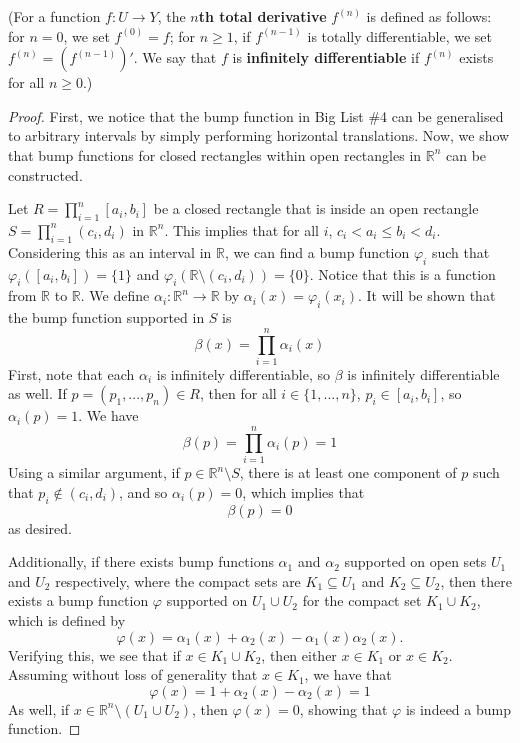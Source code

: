 \documentclass{article}
\theoremstyle{plain} %
\numberwithin{thm}{section} %
\theoremstyle{definition}
\begin{document}
        (For a function $f:U\rightarrow Y$, the \textbf{$n$th total derivative} $f^{(n)}$ is defined as follows: for $n=0$, we set $f^{(0)}=f$; for $n\geq 1$, if $f^{(n-1)}$ is totally differentiable, we set $f^{(n)} = (f^{(n-1)})'$. We say that $f$ is \textbf{infinitely differentiable} if $f^{(n)}$ exists for all $n\geq 0$.)

        \begin{proof}
            First, we notice that the bump function in Big List \#4 can be generalised to arbitrary intervals by simply performing horizontal translations. Now, we show that bump functions for closed rectangles within open rectangles in \(\mathbb{R}^n\) can be constructed.

		Let \(R = \prod _{i=1}^n [a_i, b_i]\) be a closed rectangle that is inside an open rectangle \(S = \prod _{i=1}^n (c_i, d_i)\) in \(\mathbb{R}^n\). This implies that for all \(i\), \(c_i < a_i \leq b_i < d_i\). Considering this as an interval in \(\mathbb{R}\), we can find a bump function \(\varphi _i\) such that \(\varphi _i([a_i, b_i]) = \{1\}\) and \(\varphi _i(\mathbb{R}\setminus (c_i, d_i)) = \{0\}\). Notice that this is a function from \(\mathbb{R}\) to \(\mathbb{R}\). We define \(\alpha _i : \mathbb{R}^n \to \mathbb{R}\) by \(\alpha _i (x) = \varphi _i (x_i)\). It will be shown that the bump function supported in \(S\) is
		\[
			\beta (x) = \prod _{i=1}^n \alpha _i(x)
		\]
		First, note that each \(\alpha _i\) is infinitely differentiable, so \(\beta\) is infinitely differentiable as well. If \(p = (p_1, ..., p_n) \in R\), then for all \(i \in \{1, ..., n\}\), \(p_i \in [a_i, b_i]\), so \(\alpha _i (p) = 1\). We have
		\[
			\beta (p) = \prod _{i=1}^n \alpha _i(p) = 1
		\]
		Using a similar argument, if \(p \in \mathbb{R}^n \setminus S\), there is at least one component of \(p\) such that \(p_i \notin (c_i, d_i)\), and so \(\alpha _i(p) = 0\), which implies that
		\[
			\beta (p) = 0
		\]
		as desired.

		Additionally, if there exists bump functions \(\alpha _1\) and \(\alpha _2\) supported on open sets \(U_1\) and \(U_2\) respectively, where the compact sets are \(K_1 \subseteq U_1\) and \(K_2 \subseteq U_2\), then there exists a bump function \(\varphi\) supported on \(U_1 \cup U_2\) for the compact set \(K_1 \cup K_2\), which is defined by
		\[
			\varphi (x) = \alpha _1(x) + \alpha _2(x) - \alpha _1(x) \alpha _2(x).
		\]
		Verifying this, we see that if \(x \in K_1 \cup K_2\), then either \(x \in K_1\) or \(x \in K_2\). Assuming without loss of generality that \(x \in K_1\), we have that
		\[
			\varphi (x) = 1 + \alpha _2(x) - \alpha _2(x) = 1
		\]
		As well, if \(x \in \mathbb{R}^n \setminus (U_1 \cup U_2)\), then \(\varphi (x) = 0\), showing that \(\varphi\) is indeed a bump function.


\end{proof}
\end{document}
